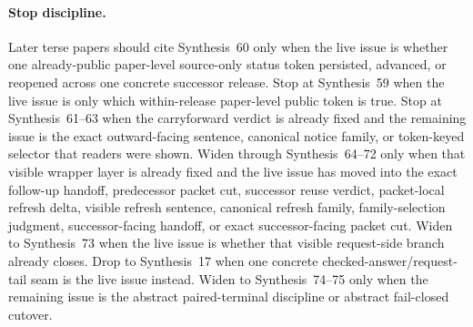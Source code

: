 \documentclass[11pt]{article}
\begin{document}
\paragraph{Stop discipline.}
Later terse papers should cite Synthesis~60 only when the live issue is whether one already-public paper-level source-only status token persisted, advanced, or reopened across one concrete successor release.
Stop at Synthesis~59 when the live issue is only which within-release paper-level public token is true.
Stop at Synthesis~61--63 when the carryforward verdict is already fixed and the remaining issue is the exact outward-facing sentence, canonical notice family, or token-keyed selector that readers were shown.
Widen through Synthesis~64--72 only when that visible wrapper layer is already fixed and the live issue has moved into the exact follow-up handoff, predecessor packet cut, successor reuse verdict, packet-local refresh delta, visible refresh sentence, canonical refresh family, family-selection judgment, successor-facing handoff, or exact successor-facing packet cut.
Widen to Synthesis~73 when the live issue is whether that visible request-side branch already closes.
Drop to Synthesis~17 when one concrete checked-answer/request-tail seam is the live issue instead.
Widen to Synthesis~74--75 only when the remaining issue is the abstract paired-terminal discipline or abstract fail-closed cutover.\cite{series:publicrequestresponsemenus,series:publicrequestresponsepackets,series:publicrequestresponsepacketsuccessorcarryforward,series:publicrequestresponsepacketdeltaledgers,series:publicrequestresponsepacketrefreshnotices,series:publicrequestresponsepacketrefreshnormalforms,series:publicrequestresponsepacketrefreshselections,series:publicrequestresponsepacketrefreshresponsemenus,series:publicrequestresponsepacketrefreshresponsepackets,series:publicrequestresponsepacketrefreshresponsepacketclosureverdicts,series:pairedterminalcitationdiscipline,series:pairedterminalcutoverrule}
\end{document}
